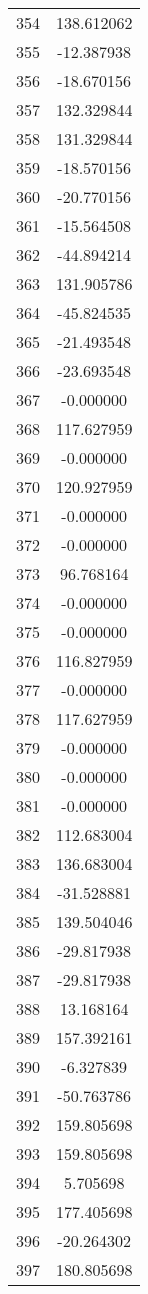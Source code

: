 \documentclass[12pt]{article}
\begin{document}
\begin{longtable}{@{}cc@{}}
354 & 138.612062 \\
355 & -12.387938 \\
356 & -18.670156 \\
357 & 132.329844 \\
358 & 131.329844 \\
359 & -18.570156 \\
360 & -20.770156 \\
361 & -15.564508 \\
362 & -44.894214 \\
363 & 131.905786 \\
364 & -45.824535 \\
365 & -21.493548 \\
366 & -23.693548 \\
367 & -0.000000 \\
368 & 117.627959 \\
369 & -0.000000 \\
370 & 120.927959 \\
371 & -0.000000 \\
372 & -0.000000 \\
373 & 96.768164 \\
374 & -0.000000 \\
375 & -0.000000 \\
376 & 116.827959 \\
377 & -0.000000 \\
378 & 117.627959 \\
379 & -0.000000 \\
380 & -0.000000 \\
381 & -0.000000 \\
382 & 112.683004 \\
383 & 136.683004 \\
384 & -31.528881 \\
385 & 139.504046 \\
386 & -29.817938 \\
387 & -29.817938 \\
388 & 13.168164 \\
389 & 157.392161 \\
390 & -6.327839 \\
391 & -50.763786 \\
392 & 159.805698 \\
393 & 159.805698 \\
394 & 5.705698 \\
395 & 177.405698 \\
396 & -20.264302 \\
397 & 180.805698 \\

\end{longtable}
\end{document}
